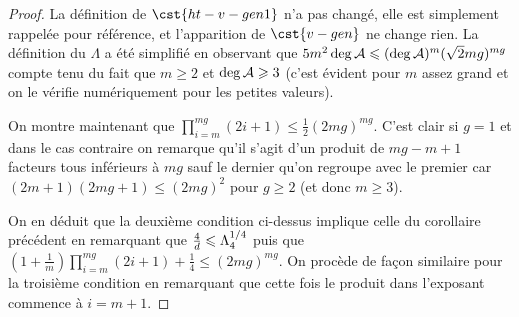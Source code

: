 \begin{proof}
  La définition de \( \cst{ht-v-gen1} \) n'a pas changé, elle est simplement
  rappelée pour référence, et l'apparition de \( \cst{v-gen} \) ne change
  rien. La définition du \( \Lambda \) a été simplifié en observant que \(
    5m^2 \deg \mathcal A \leqslant (\deg \mathcal A)^m (\sqrt2
    mg)^{mg} \) compte tenu du fait que \( m \ge 2 \)
  et \( \deg \mathcal A \geqslant 3 \) (c'est évident pour \( m \) assez grand et on
  le vérifie numériquement pour les petites valeurs).

  On montre maintenant que \( \prod_{i=m}^{mg} (2i + 1) \le
    \frac12 (2mg)^{mg} \). C'est clair si \( g = 1 \)
  et dans le cas contraire on remarque qu'il s'agit d'un produit de \(
    mg - m + 1 \) facteurs tous inférieurs à \( mg \)
  sauf le dernier qu'on regroupe avec le premier car \( (2m +
    1)(2mg + 1) \le (2mg)^2 \) pour \( g \ge 2 \) (et
  donc \( m \ge 3 \)).

  On en déduit que la deuxième condition ci-dessus implique celle du
  corollaire précédent en remarquant que \( \frac4{d} \leqslant \Lambda_4^{1/4}
  \) puis que \( (1 + \frac1m) \prod_{i=m}^{mg} (2i + 1) +
    \frac14 \le (2mg)^{mg} \). On procède de façon
  similaire pour la troisième condition en remarquant que cette fois le
  produit dans l'exposant commence à \( i = m + 1 \).
\end{proof}


\cleardoublepage
\endinput

